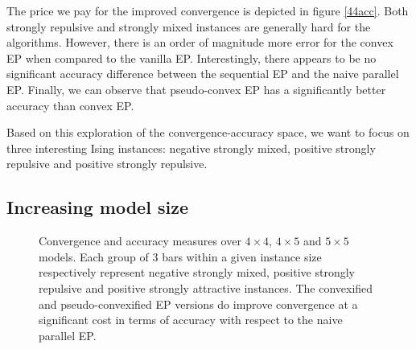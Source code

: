 \documentclass[times, 10pt,twocolumn]{article}
\begin{document}
The price we pay for the improved convergence is depicted in figure \ref{44acc}. Both strongly repulsive and strongly mixed instances are generally hard for the algorithms. However, there is an order of magnitude more error for the convex EP when compared to the vanilla EP. Interestingly, there appears to be no significant accuracy difference between the sequential EP and the naive parallel EP. Finally, we can observe that pseudo-convex EP has a significantly better accuracy than convex EP.

Based on this exploration of the convergence-accuracy space, we want to focus on three interesting Ising instances: negative strongly mixed, positive strongly repulsive and positive strongly repulsive.

\subsection{Increasing model size}
\begin{figure}[ht!]\centering
	\caption{Convergence and accuracy measures over $4 \times 4$, $4 \times 5$ and $5 \times 5$ models. Each group of 3 bars within a given instance size respectively represent negative strongly mixed, positive strongly repulsive and positive strongly attractive instances. The convexified and pseudo-convexified EP versions do improve convergence at a significant cost in terms of accuracy with respect to the naive parallel EP.}
	\label{444555}
\end{figure}
\end{document}
